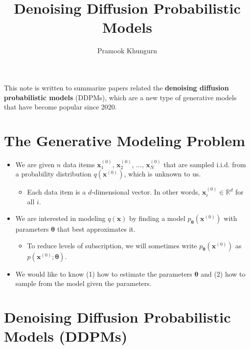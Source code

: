 \documentclass[10pt]{article}
\title{Denoising Diffusion Probabilistic Models}
\author{Pramook Khungurn}
\newcommand{\ve}[1]{\mathbf{#1}}
\newcommand{\Real}{\mathbb{R}}
\begin{document}
\maketitle

This note is written to summarize papers related the {\bf denoising diffusion probabilistic models} (DDPMs), which are a new type of generative models that have become popular since 2020.

\section{The Generative Modeling Problem}

\begin{itemize}
  \item We are given $n$ data items $\ve{x}_1^{(0)}$, $\ve{x}_2^{(0)}$, $\dotsc$, $\ve{x}_N^{(0)}$ that are sampled i.i.d. from a probability distribution $q(\ve{x}^{(0)})$, which is unknown to us.
  \begin{itemize}
    \item Each data item is a $d$-dimensional vector. In other words, $\ve{x}^{(0)}_i \in \Real^d$ for all $i$. 
  \end{itemize}
  
  \item We are interested in modeling $q(\ve{x})$ by finding a model $p_{\boldsymbol{\theta}}(\ve{x}^{(0)})$ with parameters $\boldsymbol{\theta}$ that best approximates it.
  \begin{itemize}
    \item To reduce levels of subscription, we will sometimes write $p_{\boldsymbol{\theta}}(\ve{x}^{(0)})$ as $p(\ve{x}^{(0)};\boldsymbol{\theta})$.
  \end{itemize}
   
  \item We would like to know (1) how to estimate the parameters $\boldsymbol{\theta}$ and (2) how to sample from the model given the parameters.
\end{itemize}

\section{Denoising Diffusion Probabilistic Models (DDPMs)}
\end{document}

